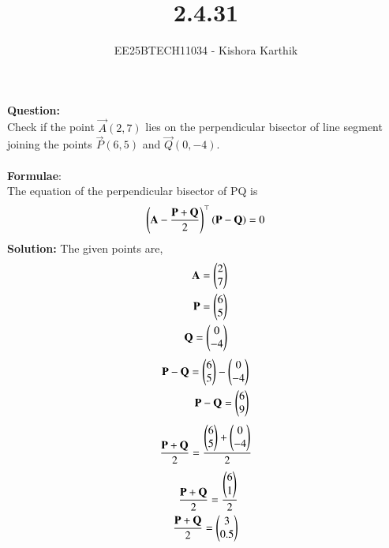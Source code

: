 \documentclass[journal]{IEEEtran}
\begin{document}

\vspace{3cm}

\title{2.4.31}
\author{EE25BTECH11034 - Kishora Karthik}
{\let\newpage\relax\maketitle}

\renewcommand{\thefigure}{\theenumi}
\renewcommand{\thetable}{\theenumi}
\textbf{Question:}\\
Check if the point $\vec{A}(2, 7)$ lies on the perpendicular bisector of line segment joining the points
$\vec{P}(6, 5)$ and $\vec{Q}(0, -4)$.\\\\
\textbf{Formulae}:\\
The equation of the perpendicular bisector of PQ is\\
\begin{align}
    \left(\mathbf{A}-\frac{\mathbf{P}+\mathbf{Q}}{2}\right)^\top\left(\mathbf{P}-\mathbf{Q}\right)=0
\end{align}
\textbf{Solution:}
The given points are,\\
\begin{align}
    \mathbf{A}=\begin{pmatrix}2\\7\end{pmatrix}\\
    \mathbf{P}=\begin{pmatrix}6\\5\end{pmatrix}\\
    \mathbf{Q}=\begin{pmatrix}0\\-4\end{pmatrix}
\end{align}
\begin{align}
    \mathbf{P}-\mathbf{Q}=\begin{pmatrix}6\\5\end{pmatrix}-\begin{pmatrix}0\\-4\end{pmatrix}\\
    \mathbf{P}-\mathbf{Q}=\begin{pmatrix}6\\9\end{pmatrix}
\end{align}
\begin{align}
    \frac{\mathbf{P}+\mathbf{Q}}{2}={\frac{\begin{pmatrix}6\\5\end{pmatrix}+\begin{pmatrix}0\\-4\end{pmatrix}}{2}}
\end{align}
\begin{align}
    \frac{\mathbf{P}+\mathbf{Q}}{2}={\frac{\begin{pmatrix}6\\1\end{pmatrix}}{2}}\\
    \frac{\mathbf{P}+\mathbf{Q}}{2}=\begin{pmatrix}3\\0.5\end{pmatrix}   
\end{align}
\end{document}
